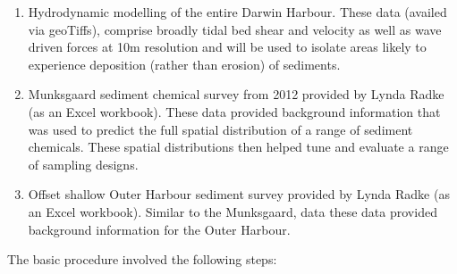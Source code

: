 \documentclass[a4paper]{article}
\begin{document}
\begin{enumerate}
\def\labelenumi{\arabic{enumi}.}
\item
  Hydrodynamic modelling of the entire Darwin Harbour. These data
  (availed via geoTiffs), comprise broadly tidal bed shear and velocity
  as well as wave driven forces at 10m resolution and will be used to
  isolate areas likely to experience deposition (rather than erosion) of
  sediments.
\item
  Munksgaard sediment chemical survey from 2012 provided by Lynda Radke
  (as an Excel workbook). These data provided background information
  that was used to predict the full spatial distribution of a range of
  sediment chemicals. These spatial distributions then helped tune and
  evaluate a range of sampling designs.
\item
  Offset shallow Outer Harbour sediment survey provided by Lynda Radke
  (as an Excel workbook). Similar to the Munksgaard, data these data
  provided background information for the Outer Harbour.
\end{enumerate}

The basic procedure involved the following steps:
\end{document}
